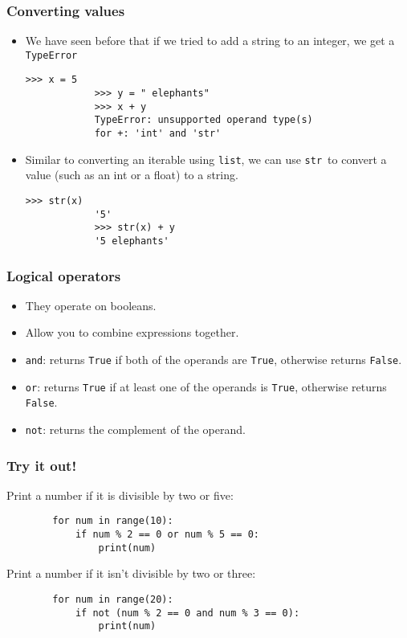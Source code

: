 \documentclass[notes]{beamer}
\begin{document}
	\begin{frame}[fragile]
		\frametitle{Converting values}
		\begin{itemize}
			\item We have seen before that if we tried to add a string to an integer, we get a \lstinline|TypeError|
			\begin{lstlisting}[basicstyle=\scriptsize\tt]
			>>> x = 5
			>>> y = " elephants"
			>>> x + y
			TypeError: unsupported operand type(s)
			for +: 'int' and 'str'
			\end{lstlisting}
			\pause
			\item Similar to converting an iterable using \lstinline|list|, we can use \lstinline|str|~to convert a value (such as an int or a float) to a string.
			\begin{lstlisting}[basicstyle=\scriptsize\tt]
			>>> str(x)
			'5'
			>>> str(x) + y
			'5 elephants'
			\end{lstlisting}
			
		\end{itemize}
	\end{frame}
	
	\begin{frame}[fragile]
		\frametitle{Logical operators}
		\begin{itemize}
			\item They operate on booleans.
			\item Allow you to combine expressions together.
			\pause
			\item \lstinline|and|: returns \lstinline|True| if both of the operands are \lstinline|True|, otherwise returns \lstinline|False|.
			\item \lstinline|or|: returns \lstinline|True| if at least one of the operands is \lstinline|True|, otherwise returns \lstinline|False|.
			\item \lstinline|not|: returns the complement of the operand.
		\end{itemize}
	\end{frame}
	
	\begin{frame}[fragile]
		\frametitle{Try it out!}
		
		Print a number if it is divisible by two or five:
		
		\begin{lstlisting}
		for num in range(10):
		    if num % 2 == 0 or num % 5 == 0:
		        print(num)
		\end{lstlisting}
		
		Print a number if it isn't divisible by two or three:
		
		\begin{lstlisting}
		for num in range(20):
		    if not (num % 2 == 0 and num % 3 == 0):
		        print(num)
		\end{lstlisting}
	\end{frame}
\end{document}
